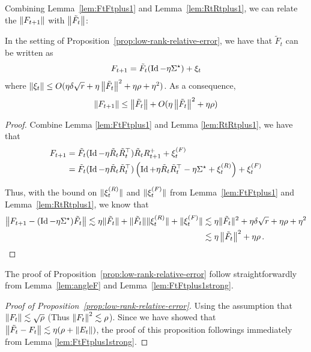 Combining Lemma~\ref{lem:FtFtplus1} and Lemma~\ref{lem:RtRtplus1}, we can relate the $\left\|F_{t+1}\right\|$ with $\left\|\tilde{F}_t\right\|$:
\begin{lem}\label{lem:FtFtplus1strong}
	In the setting of Proposition~\ref{prop:low-rank-relative-error}, we have that $\tilde{F}_t$ can be written as 
	\begin{align*}
	F_{t+1} = \tilde{F}_t(\operatorname{Id} - \eta {{\Sigma}^\star}) + \xi_t
	\end{align*}
	where $\left\|\xi_t\right\| \le O(\eta\delta\sqrt{r}  + \eta \left\|\tilde{F}_t\right\|^2 +  \eta \rho + \eta^2)$. As a consequence, 
	\begin{align*}
	\left\|F_{t+1}\right\| \le \left\|\tilde{F}_t\right\| + O(\eta \left\|\tilde{F}_t\right\|^2 + \eta \rho)
	\end{align*}
\end{lem}
\begin{proof}
	Combine Lemma \ref{lem:FtFtplus1} and Lemma \ref{lem:RtRtplus1}, we have that 
	\begin{align*}
	F_{t + 1} &= \tilde{F}_t(\operatorname{Id} -\eta \tilde{R}_t\tilde{R}_t^\top )\tilde{R}_tR_{t+1}^{+} + \xi_t^{(F)}
	\\
	&= \tilde{F}_t(\operatorname{Id} -\eta \tilde{R}_t\tilde{R}_t^\top)\left(\operatorname{Id} + \eta \tilde{R}_t\tilde{R}_t^\top - \eta {{\Sigma}^\star} + \xi_t^{(R)} \right) + \xi_t^{(F)}
	\end{align*}
	
	Thus, with the bound on $\|\xi_t^{(R)} \|$ and $\|\xi_t^{(F)} \|$ from Lemma~\ref{lem:FtFtplus1} and Lemma~\ref{lem:RtRtplus1}, we know that 
	\begin{align}
	\left\|F_{t + 1} - (\operatorname{Id} - \eta {{\Sigma}^\star}) \tilde{F}_t\right\| \lesssim  \eta \|\tilde{F}_t\| +  \|\tilde{F}_t\| \|\xi_t^{(R)}\|  + \|\xi_t^{(F)}\| &\lesssim \eta \|\tilde{F}_t\|^2 + \eta \delta \sqrt{r} + \eta  \rho + \eta^2\nonumber\\
	& \lesssim \eta \left\|\tilde{F}_t\right\|^2 + \eta \rho\,.\nonumber
	\end{align}
\end{proof}

The proof of Proposition~\ref{prop:low-rank-relative-error} follow straightforwardly from Lemma~\ref{lem:angleF} and Lemma~\ref{lem:FtFtplus1strong}. 

\begin{proof}[Proof of Proposition~\ref{prop:low-rank-relative-error}]
	Using the assumption that $\left\|F_t\right\| \lesssim \sqrt{\rho}$ (Thus $\left\|F_t\right\|^2 \lesssim \rho$). Since we have showed that $\left\|\tilde{F_t} - F_t\right\| \lesssim \eta (\rho + \left\|E_t\right\|) $, the proof of this proposition followings immediately from Lemma \ref{lem:FtFtplus1strong}. 
\end{proof}


